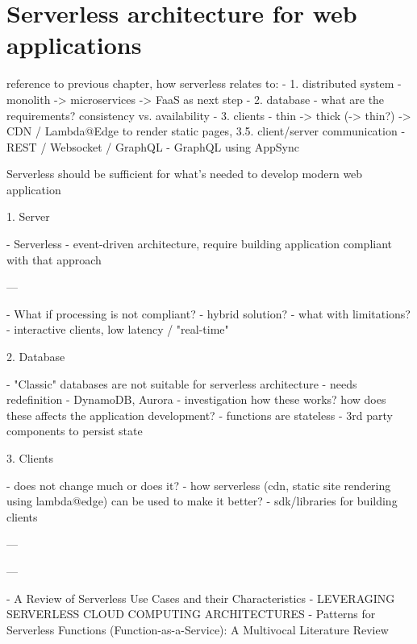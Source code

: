\chapter{Serverless architecture for web applications}


reference to previous chapter, how serverless relates to:
- 1. distributed system - monolith -> microservices -> FaaS as next step
- 2. database - what are the requirements? consistency vs. availability
- 3. clients - thin -> thick (-> thin?) -> CDN / Lambda@Edge to render static pages, 3.5. client/server communication - REST / Websocket / GraphQL - GraphQL using AppSync

Serverless should be sufficient for what's needed to develop modern web application 

1. Server

- Serverless - event-driven architecture, require building application compliant with that approach

---

- What if processing is not compliant? - hybrid solution?
- what with limitations? - interactive clients, low latency / "real-time" 

2. Database

- "Classic" databases are not suitable for serverless architecture - needs redefinition - DynamoDB, Aurora - investigation how these works? how does these affects the application development?
- functions are stateless - 3rd party components to persist state

3. Clients 

- does not change much or does it?
- how serverless (cdn, static site rendering using lambda@edge) can be used to make it better?
- sdk/libraries for building clients

---

---

- A Review of Serverless Use Cases and their Characteristics
- LEVERAGING SERVERLESS CLOUD COMPUTING ARCHITECTURES
- Patterns for Serverless Functions (Function-as-a-Service): A Multivocal Literature Review